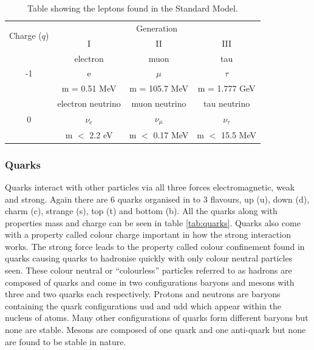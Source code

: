     \begin {table}[h]
        \begin{center}
        \begin{tabular}{|c|c|c|c|}
            \hline
            \multirow{2}{*}{Charge ($q$)}      & \multicolumn{3}{c|}{Generation} \\
            \cline{2-4}
                                & I     & II    & III   \\
            \hline
            \multirow{3}{*}{\Large -1} & electron & muon & tau \\
                                & {\Huge e}     & {\Huge $\mu$} & {\Huge $\tau$} \\
                                & m = 0.51 MeV  & m = 105.7 MeV & m = 1.777 GeV \\
            \hline
            \multirow{3}{*}{\Large 0} & electron neutrino & muon neutrino & tau neutrino \\
                                & {\Huge $\nu_{e}$} & {\Huge $\nu_{\mu}$} & {\Huge $\nu_{\tau}$}     \\
                                & m $<$ 2.2 eV      & m $<$ 0.17 MeV      & m $<$ 15.5 MeV \\
            \hline
        \end{tabular}
        \caption{Table showing the leptons found in the Standard Model.}
        \label{tab:leptons}
        \end{center}
    \end {table}
 
    \subsubsection*{Quarks}
    Quarks interact with other particles via all three forces electromagnetic, weak and strong. Again there are 6 quarks organised in to 3 flavours, up (u), down (d), charm (c), strange (s), top (t) and bottom (b). All the quarks along with properties mass and charge can be seen in table \ref{tab:quarks}. Quarks also come with a property called colour charge important in how the strong interaction works. The strong force leads to the property called colour confinement found in quarks causing quarks to hadronise quickly with only colour neutral particles seen. These colour neutral or ``colourless'' particles referred to as hadrons are composed of quarks and come in two configurations baryons and mesons with three and two quarks each respectively. Protons and neutrons are baryons containing the quark configurations uud and udd which appear within the nucleus of atoms. Many other configurations of quarks form different baryons but none are stable. Mesons are composed of one quark and one anti-quark but none are found to be stable in nature. 

